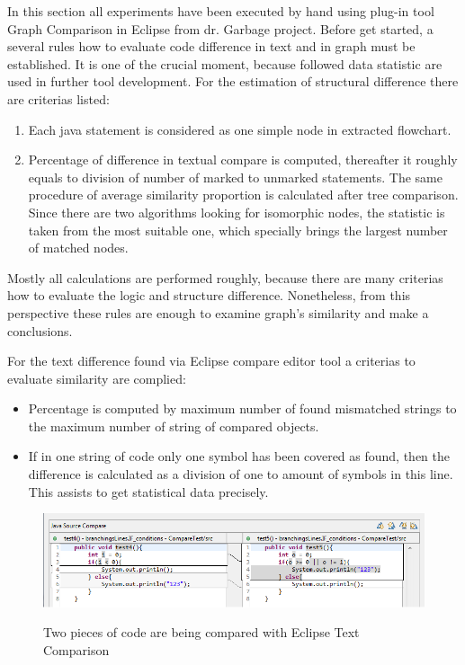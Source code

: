 \documentclass{report}
\begin{document}
In this section all experiments have been executed by hand using plug-in tool Graph Comparison in Eclipse from dr. Garbage project. Before get started, a several rules how to evaluate code difference in text and in graph must be established. It is one of the crucial moment, because followed data statistic are used in further tool development. For the estimation of structural difference there are criterias listed:
\begin{enumerate}
	\item Each java statement is considered as one simple node in extracted flowchart.
	\item Percentage of difference in textual compare is computed, thereafter it roughly equals to division of number of marked to unmarked statements. The same procedure of average similarity proportion is calculated after tree comparison. Since there are two algorithms looking for isomorphic nodes, the statistic is taken from the most suitable one, which specially brings the largest number of matched nodes.
\end{enumerate}

Mostly all calculations are performed roughly, because there are many criterias how to evaluate the logic and structure difference. Nonetheless, from this perspective these rules are enough to examine graph's similarity and make a conclusions.

For the text difference found via Eclipse compare editor tool a criterias to evaluate similarity are complied:
\begin{itemize}
	\item Percentage is computed by maximum number of found mismatched strings to the maximum number of string of compared objects.
	\item If in one string of code only one symbol has been covered as found, then the difference is calculated as a division of one to amount of symbols in this line. This assists to get statistical data precisely.
\end{itemize}

\begin{figure}[h]
  \centering
  \includegraphics[scale = 0.5]{Figures/Java-flowchart-exp/example-graph.png}\\[0.1cm]
  \caption[Two pieces of code are compared with Eclipse text compare editor]{Two pieces of code are being compared with Eclipse Text Comparison}
  \label{fig:example-graph}
\end{figure}
\end{document}
